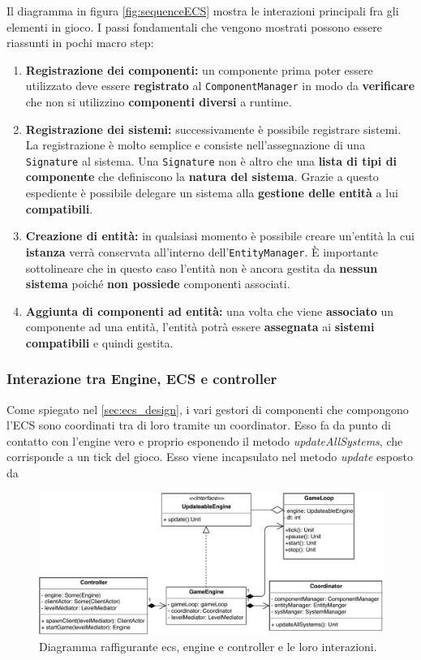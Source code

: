 Il diagramma in figura \ref{fig:sequenceECS} mostra le interazioni principali fra gli elementi in gioco. I passi fondamentali che vengono mostrati possono essere riassunti in pochi macro step:
\begin{enumerate}
	\item{\textbf{Registrazione dei componenti:}} un componente prima poter essere utilizzato deve essere \textbf{registrato} al \texttt{ComponentManager} in modo da \textbf{verificare} che non si utilizzino \textbf{componenti diversi} a runtime.
	\item{\textbf{Registrazione dei sistemi:}} successivamente è possibile registrare sistemi. La registrazione è molto semplice e consiste nell'assegnazione di una \texttt{Signature} al sistema. Una \texttt{Signature} non è altro che una \textbf{lista di tipi di componente} che definiscono la \textbf{natura del sistema}. Grazie a questo espediente è possibile delegare un sistema alla \textbf{gestione delle entità} a lui \textbf{compatibili}.
	\item{\textbf{Creazione di entità:}} in qualsiasi momento è possibile creare un'entità la cui \textbf{istanza} verrà conservata all'interno dell'\texttt{EntityManager}. È importante sottolineare che in questo caso l'entità non è ancora gestita da \textbf{nessun sistema} poiché \textbf{non possiede} componenti associati.
	\item{\textbf{Aggiunta di componenti ad entità:}} una volta che viene \textbf{associato} un componente ad una entità, l'entità potrà essere \textbf{assegnata} ai \textbf{sistemi compatibili} e quindi gestita.
\end{enumerate}

\subsubsection{Interazione tra Engine, ECS e controller}
Come spiegato nel \ref{sec:ecs_design}, i vari gestori di componenti che compongono l'ECS sono coordinati tra di loro tramite un coordinator. Esso fa da punto di contatto con l'engine vero e proprio esponendo il metodo \emph{updateAllSystems}, che corrisponde a un tick del gioco. Esso viene incapsulato nel metodo \emph{update} esposto da
\begin{figure}[H]
	\centering
	\includegraphics[width=\columnwidth]{drawio/ECS-engine-controller/ecs-engine-controller.pdf}
	\caption{Diagramma raffigurante ecs, engine e controller e le loro interazioni.}
	\label{fig:ecsenginecontroller}
\end{figure}